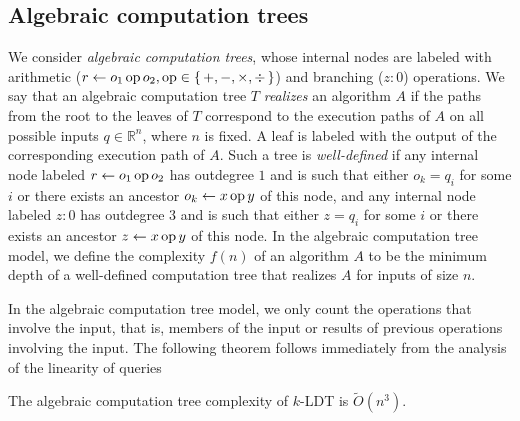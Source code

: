 
\subsection{Algebraic computation trees}
\label{app:act}

We consider \emph{algebraic computation trees}, whose internal nodes
are labeled with arithmetic (\(r \gets o_1 \operatorname{op} o_2, \operatorname{op} \in
\{\,+,-,\times,\div\,\}\)) and branching (\(z : 0\)) operations. We say that an
algebraic computation tree $T$ \emph{realizes} an algorithm $A$ if the paths
from the root to the leaves of $T$ correspond to the execution paths of \(A\)
on all possible inputs \(q \in \mathbb{R}^n\), where \(n\) is fixed. A leaf is
labeled with the output of the corresponding execution path of \(A\). Such a
tree is \emph{well-defined} if any internal node labeled \(r \gets o_1 \operatorname{op}
o_2\) has outdegree \(1\) and is such that either \(o_k = q_i\) for some \(i\)
or there exists an ancestor \(o_k \gets x \operatorname{op} y\) of this node, and any
internal node labeled \(z : 0\) has outdegree \(3\) and is such that either \(z
= q_i\) for some \(i\) or there exists an ancestor \(z \gets x \operatorname{op} y\) of this
node. In the algebraic computation tree model, we define the complexity
\(f(n)\) of an algorithm $A$ to be the minimum depth of a well-defined
computation tree that realizes $A$ for inputs of size $n$.

In the algebraic computation tree model, we only count the operations that
involve the input, that is, members of the input or results of previous
operations involving the input. The following theorem follows immediately from
the analysis of the linearity of queries
\begin{theorem}\label{thm:act}
	The algebraic computation tree complexity of \(k\)-LDT is
	\(\tilde{O}(n^3)\).
\end{theorem}

